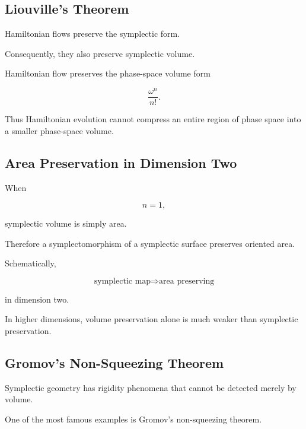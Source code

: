 \subsection{Liouville's Theorem}
\label{subsec:liouville-theorem-symplectic}

Hamiltonian flows preserve the symplectic form.

Consequently, they also preserve symplectic volume.

\begin{theorem}
Hamiltonian flow preserves the phase-space volume form

\[
\boxed{
\frac{\omega^n}{n!}.
}
\]
\end{theorem}

Thus Hamiltonian evolution cannot compress an entire region of phase space
into a smaller phase-space volume.

\subsection{Area Preservation in Dimension Two}
\label{subsec:area-preservation-symplectic}

When

\[
n=1,
\]

symplectic volume is simply area.

Therefore a symplectomorphism of a symplectic surface preserves oriented
area.

Schematically,

\[
\boxed{
\text{symplectic map}
\Longrightarrow
\text{area preserving}
}
\]

in dimension two.

In higher dimensions, volume preservation alone is much weaker than
symplectic preservation.

\subsection{Gromov's Non-Squeezing Theorem}
\label{subsec:gromov-nonsqueezing}

Symplectic geometry has rigidity phenomena that cannot be detected merely by
volume.

One of the most famous examples is Gromov's non-squeezing theorem.

